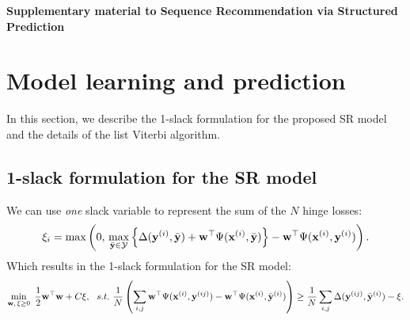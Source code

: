 \appendix
{\Large\bf Supplementary material to Sequence Recommendation via Structured Prediction}


\section{Model learning and prediction}
\label{sec:supplement}

In this section, we describe the 1-slack formulation for the proposed SR model 
and the details of the list Viterbi algorithm.

\subsection{1-slack formulation for the SR model}
\label{ssec:1slack_sr}

We can use \emph{one} slack variable to represent the sum of the $N$ hinge losses:
\begin{equation*}
\xi_i = \max \left( 0, \, 
        \max_{\bar{\mathbf{y}} \in \mathcal{Y}}
        \left\{ \Delta(\mathbf{y}^{(i)}, \bar{\mathbf{y}}) + \mathbf{w}^\top \Psi(\mathbf{x}^{(i)}, \bar{\mathbf{y}}) \right\} - \mathbf{w}^\top \Psi(\mathbf{x}^{(i)}, \mathbf{y}^{(i)}) \right).
\end{equation*}
Which results in the 1-slack formulation for the SR model:
\begin{equation*}
\begin{aligned}
\min_{\mathbf{w}, \, \xi \ge 0} ~\frac{1}{2} \mathbf{w}^\top \mathbf{w} + C \xi, ~~s.t.~ \frac{1}{N} \left( \sum_{i,j} \mathbf{w}^\top \Psi(\mathbf{x}^{(i)}, \mathbf{y}^{(ij)}) - \mathbf{w}^\top \Psi(\mathbf{x}^{(i)}, \bar{\mathbf{y}}^{(i)}) \right) 
  \ge \frac{1}{N} \sum_{i,j} \Delta(\mathbf{y}^{(ij)}, \bar{\mathbf{y}}^{(i)}) - \xi.
\end{aligned}
\end{equation*}


